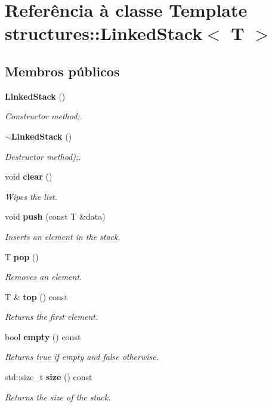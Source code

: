\section{Referência à classe Template structures\+:\+:Linked\+Stack$<$ T $>$}
\label{classstructures_1_1_linked_stack}
\subsection*{Membros públicos}
\begin{DoxyCompactItemize}
\item 
\textbf{ Linked\+Stack} ()
\begin{DoxyCompactList}\small\item\em Constructor method;. \end{DoxyCompactList}\item 
\textbf{ $\sim$\+Linked\+Stack} ()
\begin{DoxyCompactList}\small\item\em Destructor method);. \end{DoxyCompactList}\item 
void \textbf{ clear} ()
\begin{DoxyCompactList}\small\item\em Wipes the list. \end{DoxyCompactList}\item 
void \textbf{ push} (const T \&data)
\begin{DoxyCompactList}\small\item\em Inserts an element in the stack. \end{DoxyCompactList}\item 
T \textbf{ pop} ()
\begin{DoxyCompactList}\small\item\em Removes an element. \end{DoxyCompactList}\item 
T \& \textbf{ top} () const
\begin{DoxyCompactList}\small\item\em Returns the first element. \end{DoxyCompactList}\item 
bool \textbf{ empty} () const
\begin{DoxyCompactList}\small\item\em Returns true if empty and false otherwise. \end{DoxyCompactList}\item 
std\+::size\+\_\+t \textbf{ size} () const
\begin{DoxyCompactList}\small\item\em Returns the size of the stack. \end{DoxyCompactList}\end{DoxyCompactItemize}


